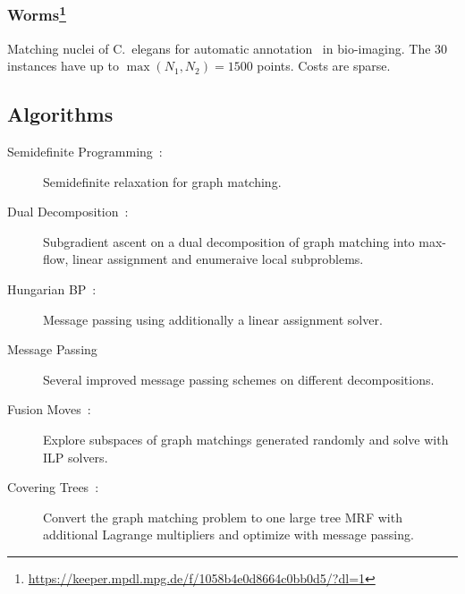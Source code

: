 
\subsubsection[Worms]{Worms\footnote{\url{https://keeper.mpdl.mpg.de/f/1058b4e0d8664c0bb0d5/?dl=1}}}
Matching nuclei of C.\ elegans for automatic annotation~\cite{kainmueller2014active} in bio-imaging. 
The 30 instances have up to $\max(N_1,N_2) = 1500$ points. Costs are sparse.


\subsection{Algorithms}
\begin{description}
\item[Semidefinite Programming~\cite{schellewald2005probabilistic}:] Semidefinite relaxation for graph matching.
\item[Dual Decomposition~\cite{torresani2012dual}:]
Subgradient ascent on a dual decomposition of graph matching into max-flow, linear assignment and enumeraive local subproblems.
\item[Hungarian BP~\cite{zhang2016pairwise}:]
Message passing using additionally a linear assignment solver.
\item[Message Passing~\cite{swoboda2017study}]
Several improved message passing schemes on different decompositions.
\item[Fusion Moves~\cite{hutschenreiter2021fusion}:] Explore subspaces of graph matchings generated randomly and solve with ILP solvers.
\item[Covering Trees~\cite{yarkony2010covering}:] Convert the graph matching problem to one large tree MRF with additional Lagrange multipliers and optimize with message passing.
\end{description}
